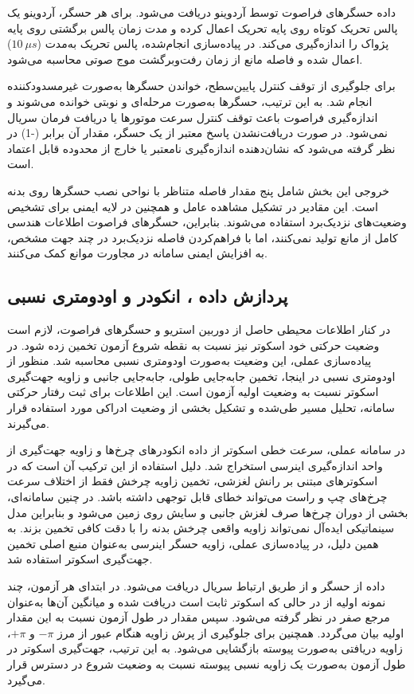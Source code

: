 داده حسگرهای فراصوت توسط آردوینو دریافت می‌شود. برای هر حسگر، آردوینو یک پالس تحریک کوتاه روی پایه تحریک اعمال کرده و مدت زمان پالس برگشتی روی پایه پژواک را اندازه‌گیری می‌کند. در پیاده‌سازی انجام‌شده، پالس تحریک به‌مدت ($10~\mu s$) اعمال شده و فاصله مانع از زمان رفت‌وبرگشت موج صوتی محاسبه می‌شود.

برای جلوگیری از توقف کنترل پایین‌سطح، خواندن حسگرها به‌صورت غیرمسدودکننده انجام شد. به این ترتیب، حسگرها به‌صورت مرحله‌ای و نوبتی خوانده می‌شوند و اندازه‌گیری فراصوت باعث توقف کنترل سرعت موتورها یا دریافت فرمان سریال نمی‌شود. در صورت دریافت‌نشدن پاسخ معتبر از یک حسگر، مقدار آن برابر (-1) در نظر گرفته می‌شود که نشان‌دهنده اندازه‌گیری نامعتبر یا خارج از محدوده قابل اعتماد است.

خروجی این بخش شامل پنج مقدار فاصله متناظر با نواحی نصب حسگرها روی بدنه است. این مقادیر در تشکیل مشاهده عامل و همچنین در لایه ایمنی برای تشخیص وضعیت‌های نزدیک‌برد استفاده می‌شوند. بنابراین، حسگرهای فراصوت اطلاعات هندسی کامل از مانع تولید نمی‌کنند، اما با فراهم‌کردن فاصله نزدیک‌برد در چند جهت مشخص، به افزایش ایمنی سامانه در مجاورت موانع کمک می‌کنند.

\subsection{پردازش داده ، انکودر و اودومتری نسبی}
\label{subsec:real_imu_encoder_odometry_processing}

در کنار اطلاعات محیطی حاصل از دوربین استریو و حسگرهای فراصوت، لازم است وضعیت حرکتی خود اسکوتر نیز نسبت به نقطه شروع آزمون تخمین زده شود. در پیاده‌سازی عملی، این وضعیت به‌صورت اودومتری نسبی محاسبه شد. منظور از اودومتری نسبی در اینجا، تخمین جابه‌جایی طولی، جابه‌جایی جانبی و زاویه جهت‌گیری اسکوتر نسبت به وضعیت اولیه آزمون است. این اطلاعات برای ثبت رفتار حرکتی سامانه، تحلیل مسیر طی‌شده و تشکیل بخشی از وضعیت ادراکی مورد استفاده قرار می‌گیرند.

در سامانه عملی، سرعت خطی اسکوتر از داده انکودرهای چرخ‌ها و زاویه جهت‌گیری از واحد اندازه‌گیری اینرسی استخراج شد. دلیل استفاده از این ترکیب آن است که در اسکوترهای مبتنی بر رانش لغزشی، تخمین زاویه چرخش فقط از اختلاف سرعت چرخ‌های چپ و راست می‌تواند خطای قابل توجهی داشته باشد. در چنین سامانه‌ای، بخشی از دوران چرخ‌ها صرف لغزش جانبی و سایش روی زمین می‌شود و بنابراین مدل سینماتیکی ایده‌آل نمی‌تواند زاویه واقعی چرخش بدنه را با دقت کافی تخمین بزند. به همین دلیل، در پیاده‌سازی عملی، زاویه  حسگر اینرسی به‌عنوان منبع اصلی تخمین جهت‌گیری اسکوتر استفاده شد.

داده  از حسگر  و از طریق ارتباط سریال دریافت می‌شود. در ابتدای هر آزمون، چند نمونه اولیه از  در حالی که اسکوتر ثابت است دریافت شده و میانگین آن‌ها به‌عنوان مرجع صفر در نظر گرفته می‌شود. سپس مقدار  در طول آزمون نسبت به این مقدار اولیه بیان می‌گردد. همچنین برای جلوگیری از پرش زاویه هنگام عبور از مرز $-\pi$ و $+\pi$، زاویه دریافتی به‌صورت پیوسته بازگشایی می‌شود. به این ترتیب، جهت‌گیری اسکوتر در طول آزمون به‌صورت یک زاویه نسبی پیوسته نسبت به وضعیت شروع در دسترس قرار می‌گیرد.

